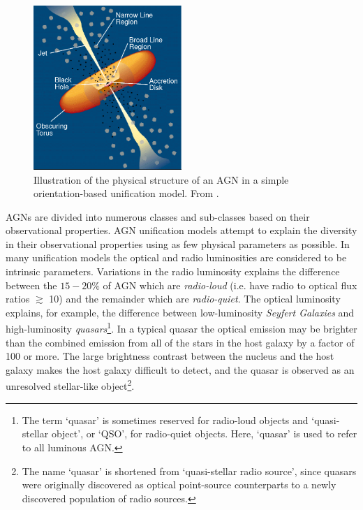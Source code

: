 \begin{figure}
  \centering
  \includegraphics[width=0.5\textwidth]{figures/chapter06/urry_model}
  \caption{Illustration of the physical structure of an AGN in a simple orientation-based unification model. From \citet{urry95}.}
  \label{fig:agnmodel}
\end{figure}

AGNs are divided into numerous classes and sub-classes based on their observational properties. AGN unification models \citep{antonucci93,urry95} attempt to explain the diversity in their observational properties using as few physical parameters as possible. In many unification models the optical and radio luminosities are considered to be intrinsic parameters. Variations in the radio luminosity explains the difference between the $15-20\%$ of AGN which are {\it radio-loud} (i.e. have radio to optical flux ratios $\gtrsim$ 10) and the remainder which are {\it radio-quiet}. The optical luminosity explains, for example, the difference between low-luminosity {\it Seyfert Galaxies} and high-luminosity {\it quasars}\footnote{The term `quasar' is sometimes reserved for radio-loud objects and `quasi-stellar object', or `QSO', for radio-quiet objects. Here, `quasar' is used to refer to all luminous AGN.}. In a typical quasar the optical emission may be brighter than the combined emission from all of the stars in the host galaxy by a factor of 100 or more. The large brightness contrast between the nucleus and the host galaxy makes the host galaxy difficult to detect, and the quasar is observed as an unresolved stellar-like object\footnote{The name `quasar' is shortened from `quasi-stellar radio source', since quasars were originally discovered as optical point-source counterparts to a newly discovered population of radio sources.}.   

